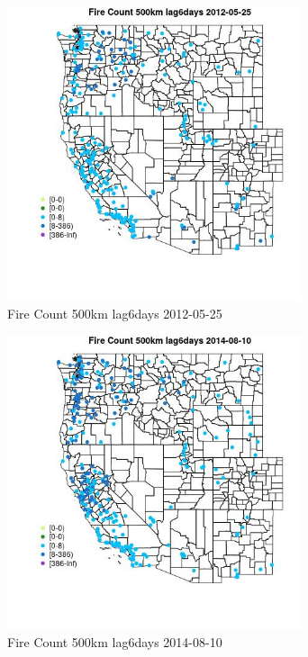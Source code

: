 \begin{figure} 
\centering  
\includegraphics[width=0.77\textwidth]{Code_Outputs/Report_ML_input_PM25_Step4_part_e_de_duplicated_aves_compiled_2019-05-18wNAs_MapObsFire_Count_500km_lag6days2012-05-25.jpg} 
\caption{\label{fig:Report_ML_input_PM25_Step4_part_e_de_duplicated_aves_compiled_2019-05-18wNAsMapObsFire_Count_500km_lag6days2012-05-25}Fire Count 500km lag6days 2012-05-25} 
\end{figure} 
 

\clearpage 

\begin{figure} 
\centering  
\includegraphics[width=0.77\textwidth]{Code_Outputs/Report_ML_input_PM25_Step4_part_e_de_duplicated_aves_compiled_2019-05-18wNAs_MapObsFire_Count_500km_lag6days2014-08-10.jpg} 
\caption{\label{fig:Report_ML_input_PM25_Step4_part_e_de_duplicated_aves_compiled_2019-05-18wNAsMapObsFire_Count_500km_lag6days2014-08-10}Fire Count 500km lag6days 2014-08-10} 
\end{figure} 
 

